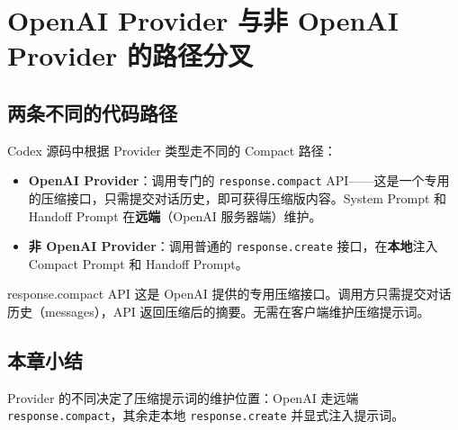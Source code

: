 \section{OpenAI Provider 与非 OpenAI Provider 的路径分叉}

\subsection{两条不同的代码路径}

Codex 源码中根据 Provider 类型走不同的 Compact 路径：

\begin{itemize}
    \item \textbf{OpenAI Provider}：调用专门的 \texttt{response.compact} API——这是一个专用的压缩接口，只需提交对话历史，即可获得压缩版内容。System Prompt 和 Handoff Prompt 在\textbf{远端}（OpenAI 服务器端）维护。
    \item \textbf{非 OpenAI Provider}：调用普通的 \texttt{response.create} 接口，在\textbf{本地}注入 Compact Prompt 和 Handoff Prompt。
\end{itemize}

\begin{knowledgebox}{response.compact API}
这是 OpenAI 提供的专用压缩接口。调用方只需提交对话历史（messages），API 返回压缩后的摘要。无需在客户端维护压缩提示词。
\end{knowledgebox}

\subsection{本章小结}

Provider 的不同决定了压缩提示词的维护位置：OpenAI 走远端 \texttt{response.compact}，其余走本地 \texttt{response.create} 并显式注入提示词。


